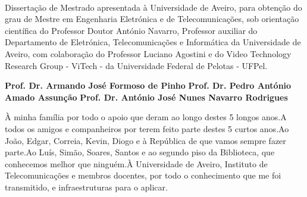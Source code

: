 \TitlePage

  \HEADER{\BAR}
         {\ThesisYear}
  \TITLE{\myName}
        {\TituloTese}
        {\ThesisTitle}
\EndTitlePage
\titlepage\ \endtitlepage %


%
%

\TitlePage
  \HEADER{}{\ThesisYear}
  \TITLE{\myName}
        {\TituloTese}
        {\ThesisTitle}
  \vskip 15mm
  \TEXT{}
       {Dissertação de Mestrado apresentada à Universidade de Aveiro, para obtenção do grau de Mestre em Engenharia Eletrónica e de Telecomunicações, sob orientação científica do Professor Doutor António Navarro, Professor auxiliar do Departamento de Eletrónica, Telecomunicações e Informática da  Universidade de Aveiro, com colaboração do Professor Luciano Agostini e do Video Technology Research Group - ViTech - da Universidade Federal de Pelotas - UFPel.}
\EndTitlePage
\titlepage\ \endtitlepage %

\TitlePage
  \vspace*{55mm}
       {}
       {\textbf{Prof. Dr. Armando José Formoso de Pinho
       }}
  \vspace*{5mm}
       {\textbf{Prof. Dr. Pedro António Amado Assunção}}
  \vspace*{5mm}
  \TEXT{}
       {\textbf{Prof. Dr. António José Nunes Navarro Rodrigues}}
\EndTitlePage
\titlepage\ \endtitlepage %

\TitlePage
  \vspace*{55mm}
       {À minha família por todo o apoio que deram ao longo destes 5 longos anos.\newline A todos os amigos e companheiros por terem feito parte destes 5 curtos anos.\newline Ao João, Edgar, Correia, Kevin, Diogo e à República de que vamos sempre fazer parte.\newline Ao Luís, Simão, Soares, Santos e ao segundo piso da Biblioteca, que conhecemos melhor que ninguém.\newline À Universidade de Aveiro, Instituto de Telecomunicações e membros docentes, por todo o conhecimento que me foi transmitido, e infraestruturas para o aplicar.}
\EndTitlePage
\titlepage\ \endtitlepage %



